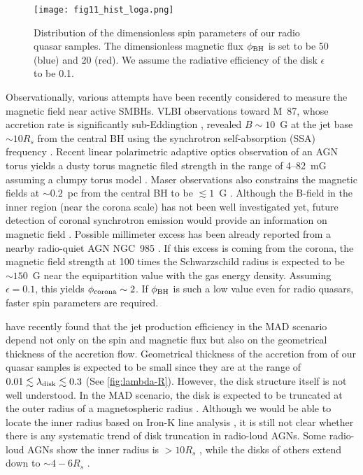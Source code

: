 \documentclass[preprint2,twocolappendix]{aastex6}
\begin{document}
\begin{figure}[t]
 \begin{center}
  \texttt{[image: fig11\_hist\_loga.png]} 
 \end{center}
\caption{Distribution of the dimensionless spin parameters of our radio quasar samples. The dimensionless magnetic flux $\phi_{\rm BH}$ is set to be 50 (blue) and 20 (red). We assume the radiative efficiency of the disk $\epsilon$ to be 0.1.}\label{fig:hist_loga}
\end{figure}

Observationally, various attempts have been recently considered to measure the magnetic field near active SMBHs. VLBI observations toward M~87, whose accretion rate is significantly sub-Eddingtion  \citep{dim03}, revealed $B\sim10$~G at the jet base $\sim10R_s$ from the central BH using the synchrotron self-absorption (SSA) frequency \citep{kin15,had16}. Recent linear polarimetric adaptive optics observation of an AGN torus yields a dusty torus magnetic filed strength in the range of 4--82~mG assuming a clumpy torus model \citep{lop15}. Maser observations also constrains the magnetic fields at $\sim0.2$~pc from the central BH to be $\lesssim1$~G \citep{gne14}. Although the B-field in the inner region (near the corona scale) has not been well investigated yet, future detection of coronal synchrotron emission would provide an information on magnetic field \citep{ino14,rag16}. Possible millimeter excess has been already reported from a nearby radio-quiet AGN NGC~985 \citep{doi16}. If this excess is coming from the corona, the magnetic field strength at 100 times the Schwarzschild radius is expected to be $\sim150$~G \citep{doi16} near the equipartition value with the gas energy density. Assuming $\epsilon=0.1$, this yields $\phi_{\rm corona}\sim2$. If $\phi_{\rm BH}$ is such a low value even for radio quasars, faster spin parameters are required. 

\citet{ava16} have recently found that the jet production efficiency in the MAD scenario depend not only on the spin and magnetic flux but also on the geometrical thickness of the accretion flow. Geometrical thickness of the accretion from of our quasar samples is expected to be small since they are at the range of $0.01 \lesssim \lambda_{\rm disk} \lesssim 0.3$ (See \autoref{fig:lambda-R}). However, the disk structure itself is not well understood. In the MAD scenario, the disk is expected to be truncated at the outer radius of a magnetospheric radius \citep{nar03}. Although we would be able to locate the inner radius based on Iron-K line analysis \citep{ger91}, it is still not clear whether there is any systematic trend of disk truncation in radio-loud AGNs. Some radio-loud AGNs show the inner radius is $>10 R_s$ \citep[e.g.,][]{lar08,sam09,taz10,tom11,taz13}, while the disks of others extend down to $\sim4-6R_s$ \citep{kat07,sam11}.
\end{document}
